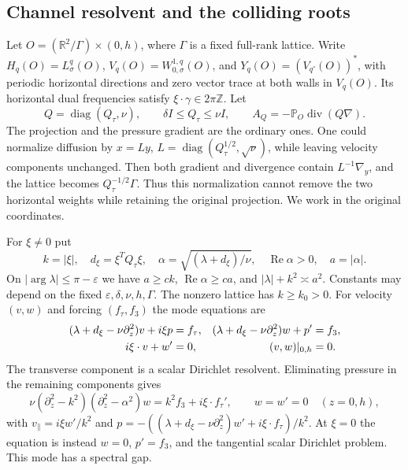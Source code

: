 \documentclass[11pt]{article}
\numberwithin{equation}{section}
\theoremstyle{remark}
\newcommand{\R}{\mathbb R}
\newcommand{\PP}{\mathbb P}
\newcommand{\divg}{\operatorname{div}}
\newcommand{\diag}{\operatorname{diag}}
\DeclareMathOperator{\Rea}{Re}
\DeclareMathOperator{\argu}{arg}
\begin{document}
\subsection{Channel resolvent and the colliding roots}\label{sec:channel}

Let $O=(\R^2/\Gamma)\times(0,h)$, where $\Gamma$ is a fixed
full-rank lattice. Write $H_q(O)=L^q_\sigma(O)$,
$V_q(O)=W^{1,q}_{0,\sigma}(O)$, and $Y_q(O)=(V_{q'}(O))^*$,
with periodic horizontal directions and zero vector trace at both walls
in $V_q(O)$. Its horizontal dual frequencies satisfy
$\xi\cdot\gamma\in2\pi\mathbb Z$. Let
\[
 Q=\diag(Q_\tau,\nu),\qquad \delta I\leq Q_\tau\leq\nu I,
 \qquad A_Q=-\PP_O\divg(Q\nabla).
\]
The projection and the pressure gradient are the ordinary ones. One
could normalize diffusion by $x=Ly$, $L=\diag(Q_\tau^{1/2},\sqrt\nu)$,
while leaving velocity components unchanged. Then both gradient and
divergence contain $L^{-1}\nabla_y$, and the lattice becomes
$Q_\tau^{-1/2}\Gamma$. Thus this normalization cannot remove the two
horizontal weights while retaining the original projection. We work in
the original coordinates.

For $\xi\ne0$ put
\begin{equation}\label{eq:roots}
 k=|\xi|,\quad d_\xi=\xi^TQ_\tau\xi,\quad
 \alpha=\sqrt{(\lambda+d_\xi)/\nu},\quad \Rea\alpha>0,
 \quad a=|\alpha|.
\end{equation}
On $|\argu\lambda|\leq\pi-\varepsilon$ we have
$a\geq ck$, $\Rea\alpha\geq ca$, and
$|\lambda|+k^2\asymp a^2$. Constants may depend on the fixed
$\varepsilon,\delta,\nu,h,\Gamma$. The nonzero lattice has $k\geq k_0>0$.
For velocity $(v,w)$ and forcing $(f_\tau,f_3)$ the mode equations are
\begin{align}\label{eq:mode}
 (\lambda+d_\xi-\nu\partial_z^2)v+i\xi p&=f_\tau,&
 (\lambda+d_\xi-\nu\partial_z^2)w+p'&=f_3,\\
 i\xi\cdot v+w'&=0,&(v,w)|_{0,h}&=0.\notag
\end{align}
The transverse component is a scalar Dirichlet resolvent. Eliminating
pressure in the remaining components gives
\begin{equation}\label{eq:clamped}
 \nu(\partial_z^2-k^2)(\partial_z^2-\alpha^2)w
 =k^2f_3+i\xi\cdot f_\tau',\qquad w=w'=0\quad(z=0,h),
\end{equation}
with $v_\parallel=i\xi w'/k^2$ and
$p=-((\lambda+d_\xi-\nu\partial_z^2)w'+i\xi\cdot f_\tau)/k^2$.
At $\xi=0$ the equation is instead $w=0$, $p'=f_3$, and the
tangential scalar Dirichlet problem. This mode has a spectral gap.
\end{document}
